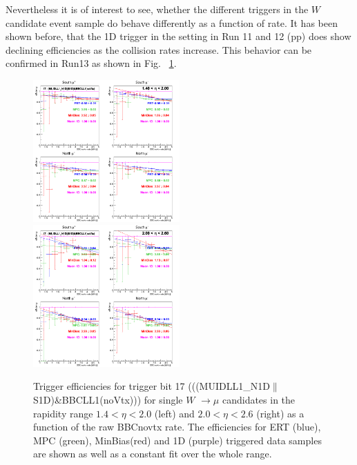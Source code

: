 Nevertheless it is of interest to see, whether the different triggers in the $W$
candidate event sample do behave differently as a function of rate. It has been
shown before, that the 1D trigger in the setting in Run 11 and 12 (pp) does show
declining efficiencies as the collision rates increase.  This behavior can be
confirmed in Run13 as shown in Fig.~ \ref{fig:run13_trigeffirate_trig17}. 

\begin{figure}[h!]

  \centering

  \includegraphics[width=0.5\textwidth]{./figures/run13_trigeffirate_eta1_trig17_lin.png}
  \includegraphics[width=0.5\textwidth]{./figures/run13_trigeffirate_eta2_trig17_lin.png}
  \caption{\label{fig:run13_trigeffirate_trig17} Trigger efficiencies for trigger bit 17 (((MUIDLL1\_N1D$\|$S1D)\&BBCLL1(noVtx))) for single $W$ $\rightarrow \mu$ candidates in the rapidity range $ 1.4 < \eta < 2.0$ (left) and  $ 2.0 < \eta < 2.6$ (right) as a function of the raw BBCnovtx rate. The efficiencies for ERT (blue), MPC (green), MinBias(red) and 1D (purple) triggered data samples are shown as well as a constant fit over the whole range.}

\end{figure}
\clearpage

